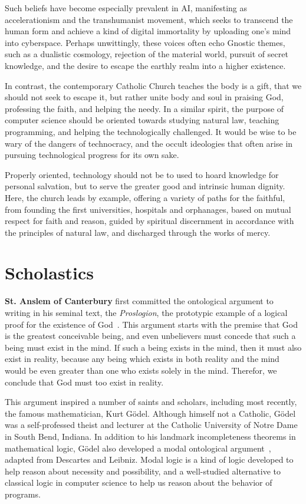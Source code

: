 \documentclass[sigplan,nonacm]{acmart}\settopmatter{printfolios=false,printccs=false,printacmref=false}
\begin{document}
  Such beliefs have become especially prevalent in AI, manifesting as accelerationism and the transhumanist movement, which seeks to transcend the human form and achieve a kind of digital immortality by uploading one's mind into cyberspace. Perhaps unwittingly, these voices often echo Gnostic themes, such as a dualistic cosmology, rejection of the material world, pursuit of secret knowledge, and the desire to escape the earthly realm into a higher existence.

  In contrast, the contemporary Catholic Church teaches the body is a gift, that we should not seek to escape it, but rather unite body and soul in praising God, professing the faith, and helping the needy. In a similar spirit, the purpose of computer science should be oriented towards studying natural law, teaching programming, and helping the technologically challenged. It would be wise to be wary of the dangers of technocracy, and the occult ideologies that often arise in pursuing technological progress for its own sake.

  Properly oriented, technology should not be to used to hoard knowledge for personal salvation, but to serve the greater good and intrinsic human dignity. Here, the church leads by example, offering a variety of paths for the faithful, from founding the first universities, hospitals and orphanages, based on mutual respect for faith and reason, guided by spiritual discernment in accordance with the principles of natural law, and discharged through the works of mercy.

  \section{Scholastics}

  \textbf{St. Anslem of Canterbury} first committed the ontological argument to writing in his seminal text, the \textit{Proslogion}, the prototypic example of a logical proof for the existence of God~\cite{anslem1078fides}. This argument starts with the premise that God is the greatest conceivable being, and even unbelievers must concede that such a being must exist in the mind. If such a being exists in the mind, then it must also exist in reality, because any being which exists in both reality and the mind would be even greater than one who exists solely in the mind. Therefor, we conclude that God must too exist in reality.

  This argument inspired a number of saints and scholars, including most recently, the famous mathematician, Kurt G\"odel. Although himself not a Catholic, G\"odel was a self-professed theist and lecturer at the Catholic University of Notre Dame in South Bend, Indiana. In addition to his landmark incompleteness theorems in mathematical logic, G\"odel also developed a modal ontological argument~\cite{wang1997logical}, adapted from Descartes and Leibniz. Modal logic is a kind of logic developed to help reason about necessity and possibility, and a well-studied alternative to classical logic in computer science to help us reason about the behavior of programs.
\end{document}

